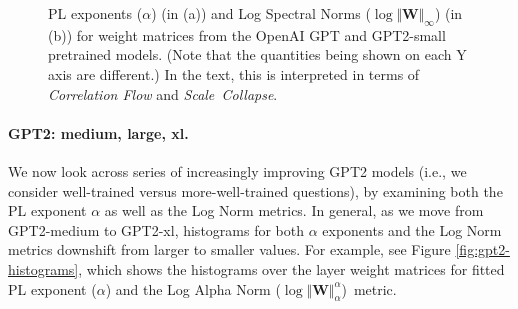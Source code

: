 \begin{figure}[htb]
    \centering
    \quad
    \caption{PL exponents ($\alpha$) (in (a)) and Log Spectral Norms ($\log\Vert\mathbf{W}\Vert_{\infty}$) (in (b)) for weight matrices from the OpenAI GPT and GPT2-small pretrained models.  (Note that the quantities being shown on each Y axis are different.)
             In the text, this is interpreted in terms of \emph{Correlation Flow} and \emph{Scale~Collapse}.
            }
    \label{fig:gpt-alpha-layers}
\end{figure}


\vspace{-1mm}
\paragraph{GPT2: medium, large, xl.} 

We now look across series of increasingly improving GPT2 models (i.e., we consider well-trained versus more-well-trained questions), by examining both the PL exponent $\alpha$ as well as the Log Norm metrics.  
In general, as we move from GPT2-medium to GPT2-xl, histograms for both $\alpha$ exponents and the Log Norm metrics downshift from larger to smaller values. 
For example, see Figure \ref{fig:gpt2-histograms}, which shows the histograms over the layer weight matrices for fitted PL exponent ($\alpha$) and the Log Alpha Norm ($\log\Vert\mathbf{W}\Vert_{\alpha}^{\alpha}$)~metric.

